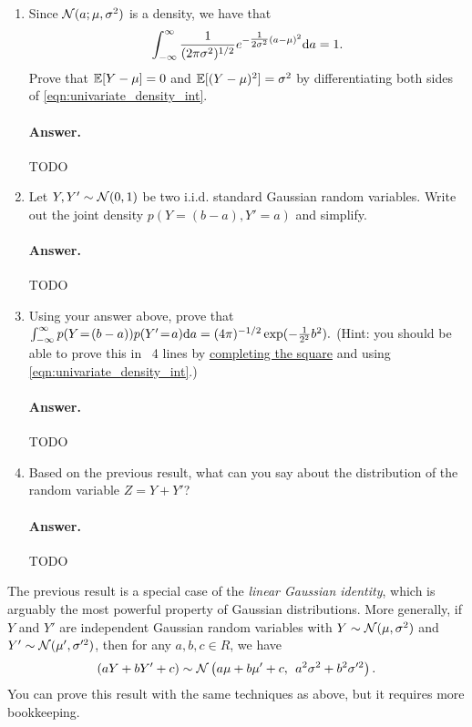 \documentclass[11pt,letterpaper]{article}
\newenvironment{answer}{%
    \vspace{1em}
    \color{black}
    \paragraph{Answer.}
  }{%
    \vspace{1em}
  }
\begin{document}
\begin{enumerate}
  \item Since $\mathcal{N}(a; \mu, \sigma^2)$ is a density, we have that
    \begin{equation}
      \int_{-\infty}^\infty \frac{1}{(2 \pi \sigma^2)^{1/2}} e^{-\tfrac{1}{2 \sigma^2} (a - \mu)^2} \textrm{d} a = 1.
      \label{eqn:univariate_density_int}
    \end{equation}
    Prove that $\mathbb{E}[Y - \mu] = 0$ and $\mathbb{E}[(Y - \mu)^2] = \sigma^2$ by differentiating both sides of \cref{eqn:univariate_density_int}.

\begin{answer}
  TODO
\end{answer}

  \item Let $Y, Y' \sim \mathcal{N}(0, 1)$ be two i.i.d. standard Gaussian random variables.
    Write out the joint density $p(Y\!=\!(b-a), Y'\!=\!a)$ and simplify.

\begin{answer}
  TODO
\end{answer}

  \item Using your answer above, prove that
    $\int_{-\infty}^{\infty} p(Y\!=\!(b-a)) p(Y'\!=\!a) \textrm{d} a = (4\pi)^{-1/2} \exp(-\tfrac{1}{2^2} b^2).$
    (Hint: you should be able to prove this in ~4 lines by \href{https://en.wikipedia.org/wiki/Completing_the_square}{completing the square}
    and using \cref{eqn:univariate_density_int}.)

\begin{answer}
  TODO
\end{answer}

  \item Based on the previous result, what can you say about the distribution of the random variable $Z = Y + Y'$?

\begin{answer}
  TODO
\end{answer}

\end{enumerate}

The previous result is a special case of the \emph{linear Gaussian identity}, which is arguably the most powerful property of Gaussian distributions.
More generally, if $Y$ and $Y'$ are independent Gaussian random variables with
$Y \sim \mathcal{N}(\mu, \sigma^2)$ and $Y' \sim \mathcal{N}(\mu', \sigma^{\prime2})$, then for any $a, b, c \in R$, we have
%
\begin{align}
  (aY + bY' + c) \sim \mathcal{N}\left(
    a\mu + b\mu' + c,
    \:\:
    a^2 \sigma^2 + b^2 \sigma^{\prime 2}
  \right).
  \label{eqn:univariate_sum}
\end{align}
%
You can prove this result with the same techniques as above, but it requires more bookkeeping.
\end{document}
